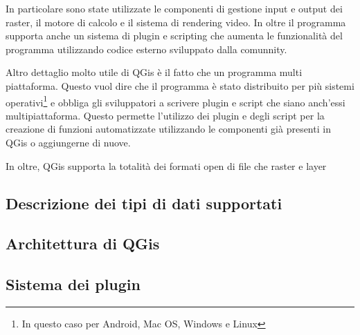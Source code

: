 In particolare sono state utilizzate le componenti di gestione input e output dei raster, il motore di calcolo e il sistema di rendering video. In oltre il programma supporta anche un sistema di plugin e scripting che aumenta le funzionalità del programma utilizzando codice esterno sviluppato dalla comunnity. 

Altro dettaglio molto utile di QGis è il fatto che un programma multi piattaforma. Questo vuol dire che il programma è stato distribuito per più sistemi operativi\footnote{In questo caso per Android, Mac OS, Windows e Linux} e obbliga gli sviluppatori a scrivere plugin e script che siano anch'essi multipiattaforma. Questo permette l'utilizzo dei plugin e degli script per la creazione di funzioni automatizzate utilizzando le componenti già presenti in QGis o aggiungerne di nuove.

In oltre, QGis supporta la totalità dei formati open di file che  raster e layer  

\subsection{Descrizione dei tipi di dati supportati}



\subsection{Architettura di QGis}

\subsection{Sistema dei plugin}
